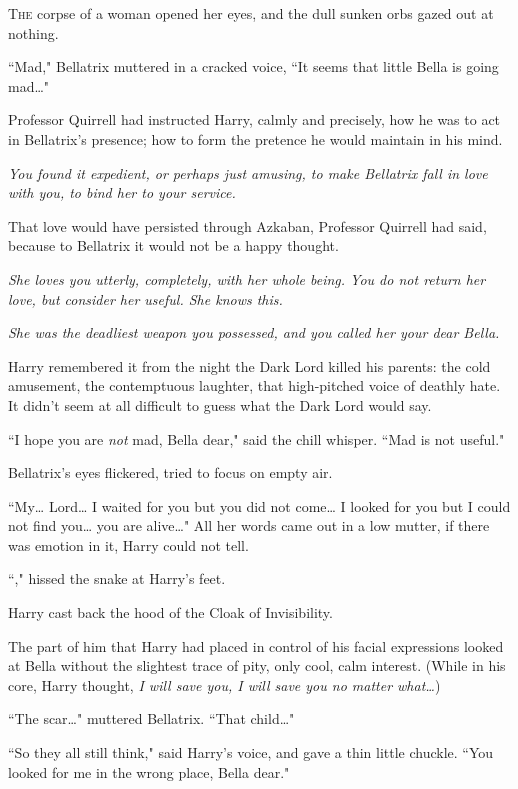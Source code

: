 
\lettrine{T}{he} corpse of a woman opened her eyes, and the dull sunken orbs gazed out at nothing.

``Mad," Bellatrix muttered in a cracked voice, ``It seems that little Bella is going mad{\ldots}"

Professor Quirrell had instructed Harry, calmly and precisely, how he was to act in Bellatrix's presence; how to form the pretence he would maintain in his mind.

\emph{You found it expedient, or perhaps just amusing, to make Bellatrix fall in love with you, to bind her to your service.}

That love would have persisted through Azkaban, Professor Quirrell had said, because to Bellatrix it would not be a happy thought.

\emph{She loves you utterly, completely, with her whole being. You do not return her love, but consider her useful. She knows this.}

\emph{She was the deadliest weapon you possessed, and you called her your dear Bella.}

Harry remembered it from the night the Dark Lord killed his parents: the cold amusement, the contemptuous laughter, that high-pitched voice of deathly hate. It didn't seem at all difficult to guess what the Dark Lord would say.

``I hope you are \emph{not} mad, Bella dear," said the chill whisper. ``Mad is not useful."

Bellatrix's eyes flickered, tried to focus on empty air.

``My{\ldots} Lord{\ldots} I waited for you but you did not come{\ldots} I looked for you but I could not find you{\ldots} you are alive{\ldots}" All her words came out in a low mutter, if there was emotion in it, Harry could not tell.

``," hissed the snake at Harry's feet.

Harry cast back the hood of the Cloak of Invisibility.

The part of him that Harry had placed in control of his facial expressions looked at Bella without the slightest trace of pity, only cool, calm interest. (While in his core, Harry thought, \emph{I will save you, I will save you no matter what{\ldots}})

``The scar{\ldots}" muttered Bellatrix. ``That child{\ldots}"

``So they all still think," said Harry's voice, and gave a thin little chuckle. ``You looked for me in the wrong place, Bella dear."

